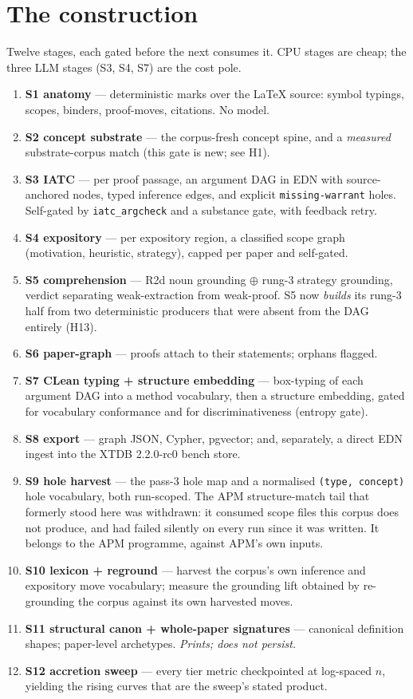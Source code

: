 \documentclass[11pt]{article}
\newcommand{\hz}[1]{\textsf{#1}}
\begin{document}
\section{The construction}

Twelve stages, each gated before the next consumes it. CPU stages are cheap;
the three LLM stages (S3, S4, S7) are the cost pole.

\begin{enumerate}
\item \textbf{S1 anatomy} --- deterministic marks over the \LaTeX{} source:
symbol typings, scopes, binders, proof-moves, citations. No model.
\item \textbf{S2 concept substrate} --- the corpus-fresh concept spine, and a
\emph{measured} substrate-corpus match (this gate is new; see \hz{H1}).
\item \textbf{S3 IATC} --- per proof passage, an argument DAG in EDN with
source-anchored nodes, typed inference edges, and explicit
\texttt{missing-warrant} holes. Self-gated by \texttt{iatc\_argcheck} and a
substance gate, with feedback retry.
\item \textbf{S4 expository} --- per expository region, a classified scope
graph (motivation, heuristic, strategy), capped per paper and self-gated.
\item \textbf{S5 comprehension} --- R2d noun grounding $\oplus$ rung-3 strategy
grounding, verdict separating weak-extraction from weak-proof. S5 now
\emph{builds} its rung-3 half from two deterministic producers that were absent
from the DAG entirely (\hz{H13}).
\item \textbf{S6 paper-graph} --- proofs attach to their statements; orphans
flagged.
\item \textbf{S7 CLean typing + structure embedding} --- box-typing of each
argument DAG into a method vocabulary, then a structure embedding, gated for
vocabulary conformance and for discriminativeness (entropy gate).
\item \textbf{S8 export} --- graph JSON, Cypher, pgvector; and, separately, a
direct EDN ingest into the XTDB 2.2.0-rc0 bench store.
\item \textbf{S9 hole harvest} --- the pass-3 hole map and a normalised
\texttt{(type, concept)} hole vocabulary, both run-scoped. The APM
structure-match tail that formerly stood here was withdrawn: it consumed scope
files this corpus does not produce, and had failed silently on every run since
it was written. It belongs to the APM programme, against APM's own inputs.
\item \textbf{S10 lexicon + reground} --- harvest the corpus's own inference
and expository move vocabulary; measure the grounding lift obtained by
re-grounding the corpus against its own harvested moves.
\item \textbf{S11 structural canon + whole-paper signatures} --- canonical
definition shapes; paper-level archetypes. \emph{Prints; does not persist.}
\item \textbf{S12 accretion sweep} --- every tier metric checkpointed at
log-spaced $n$, yielding the rising curves that are the sweep's stated product.
\end{enumerate}
\end{document}
